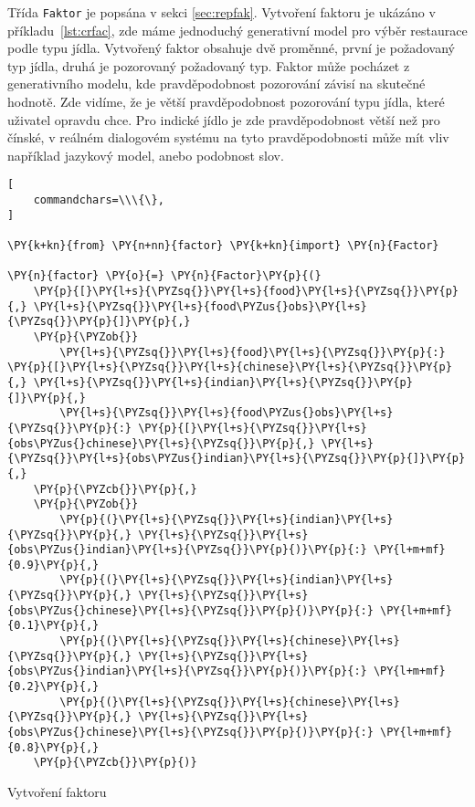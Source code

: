 Třída \texttt{Faktor} je popsána v sekci \ref{sec:repfak}.
Vytvoření faktoru je ukázáno v příkladu~\ref{lst:crfac}, zde máme jednoduchý generativní model pro výběr restaurace podle typu jídla.
Vytvořený faktor obsahuje dvě proměnné, první je požadovaný typ jídla, druhá je pozorovaný požadovaný typ.
Faktor může pocházet z generativního modelu, kde pravděpodobnost pozorování závisí na skutečné hodnotě.
Zde vidíme, že je větší pravděpodobnost pozorování typu jídla, které uživatel opravdu chce.
Pro indické jídlo je zde pravděpodobnost větší než pro čínské, v reálném dialogovém systému na tyto pravděpodobnosti může mít vliv například jazykový model, anebo podobnost slov.

\begin{example}
\begin{Verbatim}[
    commandchars=\\\{\},
]

\PY{k+kn}{from} \PY{n+nn}{factor} \PY{k+kn}{import} \PY{n}{Factor}

\PY{n}{factor} \PY{o}{=} \PY{n}{Factor}\PY{p}{(}
    \PY{p}{[}\PY{l+s}{\PYZsq{}}\PY{l+s}{food}\PY{l+s}{\PYZsq{}}\PY{p}{,} \PY{l+s}{\PYZsq{}}\PY{l+s}{food\PYZus{}obs}\PY{l+s}{\PYZsq{}}\PY{p}{]}\PY{p}{,}
    \PY{p}{\PYZob{}}
        \PY{l+s}{\PYZsq{}}\PY{l+s}{food}\PY{l+s}{\PYZsq{}}\PY{p}{:} \PY{p}{[}\PY{l+s}{\PYZsq{}}\PY{l+s}{chinese}\PY{l+s}{\PYZsq{}}\PY{p}{,} \PY{l+s}{\PYZsq{}}\PY{l+s}{indian}\PY{l+s}{\PYZsq{}}\PY{p}{]}\PY{p}{,}
        \PY{l+s}{\PYZsq{}}\PY{l+s}{food\PYZus{}obs}\PY{l+s}{\PYZsq{}}\PY{p}{:} \PY{p}{[}\PY{l+s}{\PYZsq{}}\PY{l+s}{obs\PYZus{}chinese}\PY{l+s}{\PYZsq{}}\PY{p}{,} \PY{l+s}{\PYZsq{}}\PY{l+s}{obs\PYZus{}indian}\PY{l+s}{\PYZsq{}}\PY{p}{]}\PY{p}{,}
    \PY{p}{\PYZcb{}}\PY{p}{,}
    \PY{p}{\PYZob{}}
		\PY{p}{(}\PY{l+s}{\PYZsq{}}\PY{l+s}{indian}\PY{l+s}{\PYZsq{}}\PY{p}{,} \PY{l+s}{\PYZsq{}}\PY{l+s}{obs\PYZus{}indian}\PY{l+s}{\PYZsq{}}\PY{p}{)}\PY{p}{:} \PY{l+m+mf}{0.9}\PY{p}{,}
		\PY{p}{(}\PY{l+s}{\PYZsq{}}\PY{l+s}{indian}\PY{l+s}{\PYZsq{}}\PY{p}{,} \PY{l+s}{\PYZsq{}}\PY{l+s}{obs\PYZus{}chinese}\PY{l+s}{\PYZsq{}}\PY{p}{)}\PY{p}{:} \PY{l+m+mf}{0.1}\PY{p}{,}
		\PY{p}{(}\PY{l+s}{\PYZsq{}}\PY{l+s}{chinese}\PY{l+s}{\PYZsq{}}\PY{p}{,} \PY{l+s}{\PYZsq{}}\PY{l+s}{obs\PYZus{}indian}\PY{l+s}{\PYZsq{}}\PY{p}{)}\PY{p}{:} \PY{l+m+mf}{0.2}\PY{p}{,}
		\PY{p}{(}\PY{l+s}{\PYZsq{}}\PY{l+s}{chinese}\PY{l+s}{\PYZsq{}}\PY{p}{,} \PY{l+s}{\PYZsq{}}\PY{l+s}{obs\PYZus{}chinese}\PY{l+s}{\PYZsq{}}\PY{p}{)}\PY{p}{:} \PY{l+m+mf}{0.8}\PY{p}{,}
    \PY{p}{\PYZcb{}}\PY{p}{)}
\end{Verbatim}
\caption{Vytvoření faktoru}
\label{lst:crfac}
\end{example}

